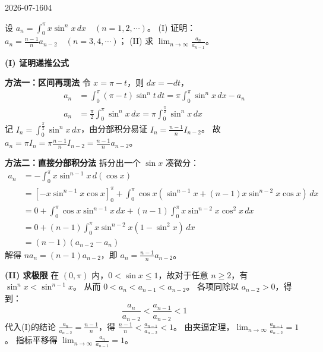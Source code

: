 \begin{mistake}{2026-07-16}{04}

\begin{problemcontent}
设 \( a_n = \int_0^\pi x \sin^n x \, dx \quad (n = 1, 2, \cdots) \)。
(I) 证明：\( a_n = \frac{n-1}{n} a_{n-2} \quad (n = 3, 4, \cdots) \)；
(II) 求 \( \lim_{n \to \infty} \frac{a_n}{a_{n-1}} \)。
\end{problemcontent}

\begin{solutioncontent}
\textbf{(I) 证明递推公式}

\textbf{方法一：区间再现法}
令 \( x = \pi - t \)，则 \( dx = -dt \)，
\[
\begin{aligned}
a_n &= \int_0^\pi (\pi - t) \sin^n t \, dt = \pi \int_0^\pi \sin^n x \, dx - a_n \\
a_n &= \frac{\pi}{2} \int_0^\pi \sin^n x \, dx = \pi \int_0^{\frac{\pi}{2}} \sin^n x \, dx
\end{aligned}
\]
记 \( I_n = \int_0^{\frac{\pi}{2}} \sin^n x \, dx \)，由分部积分易证 \( I_n = \frac{n-1}{n}I_{n-2} \)。
故 \( a_n = \pi I_n = \pi \frac{n-1}{n} I_{n-2} = \frac{n-1}{n} a_{n-2} \)。

\textbf{方法二：直接分部积分法}
拆分出一个 \( \sin x \) 凑微分：
\[
\begin{aligned}
a_n &= -\int_0^\pi x \sin^{n-1} x \, d(\cos x) \\
&= \left[ -x \sin^{n-1} x \cos x \right]_0^\pi + \int_0^\pi \cos x \left( \sin^{n-1} x + (n-1)x \sin^{n-2} x \cos x \right) \, dx \\
&= 0 + \int_0^\pi \cos x \sin^{n-1} x \, dx + (n-1) \int_0^\pi x \sin^{n-2} x \cos^2 x \, dx \\
&= 0 + (n-1) \int_0^\pi x \sin^{n-2} x (1 - \sin^2 x) \, dx \\
&= (n-1)(a_{n-2} - a_n)
\end{aligned}
\]
解得 \( n a_n = (n-1)a_{n-2} \)，即 \( a_n = \frac{n-1}{n} a_{n-2} \)。

\textbf{(II) 求极限}
在 \( (0, \pi) \) 内，\( 0 < \sin x \le 1 \)，故对于任意 \( n \ge 2 \)，有 \( \sin^n x < \sin^{n-1} x \)。
从而 \( 0 < a_n < a_{n-1} < a_{n-2} \)。
各项同除以 \( a_{n-2} > 0 \)，得到：
\[ \frac{a_n}{a_{n-2}} < \frac{a_{n-1}}{a_{n-2}} < 1 \]
代入(I)的结论 \( \frac{a_n}{a_{n-2}} = \frac{n-1}{n} \)，得 \( \frac{n-1}{n} < \frac{a_{n-1}}{a_{n-2}} < 1 \)。
由夹逼定理，\( \lim_{n \to \infty} \frac{a_{n-1}}{a_{n-2}} = 1 \)。
指标平移得 \( \lim_{n \to \infty} \frac{a_n}{a_{n-1}} = 1 \)。
\end{solutioncontent}


\end{mistake}
